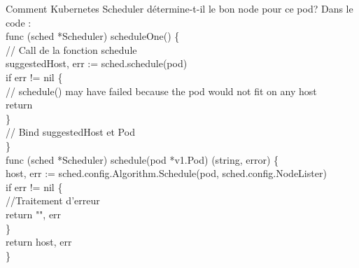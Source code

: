 \documentclass{bredelebeamer}
\begin{document}
\begin{frame}{Comment Kubernetes Scheduler détermine-t-il le bon node pour ce pod?}
Dans le code : \\
\textcolor{Framarouge}{func }\textcolor{Framaviolet}{(}\textcolor{Framaorange}{sched }\textcolor{Framaviolet}{*}\textcolor{Framaorange}{Scheduler}\textcolor{Framaviolet}{)} \textcolor{Framaviolet}{scheduleOne}() \{  \\
\hspace{10px}    \textcolor{Framavert}{// Call de la fonction schedule}\\


\hspace{10px}suggestedHost, err \textcolor{Framarouge}{:=} sched.\textcolor{Framableu}{schedule}(pod)	\\
\hspace{10px}\textcolor{Framarouge}{if} err != \textcolor{Framableu}{nil} \{	\\
\hspace{10px}\hspace{10px}	// schedule() may have failed because the pod would not fit on any host \\
	\hspace{10px}\hspace{10px}	\textcolor{Framarouge}{return}	\\
	\hspace{10px}\}	\\
\hspace{10px}    \textcolor{Framavert}{// Bind suggestedHost et Pod}\\
\}\\
\vspace{10px}
\textcolor{Framarouge}{func }\textcolor{Framaviolet}{(}\textcolor{Framaorange}{sched} \textcolor{Framaviolet}{*}\textcolor{Framaorange}{Scheduler}\textcolor{Framaviolet}{)}  \textcolor{Framaviolet}{schedule}(\textcolor{Framaorange}{pod} *\textcolor{Framaorange}{v1}.\textcolor{Framaorange}{Pod}) (\textcolor{Framaorange}{string}, \textcolor{Framaorange}{error}) \{	\\
\hspace{10px}host, err \textcolor{Framarouge}{:=} sched.config.Algorithm.\textcolor{Framableu}{Schedule}(pod, sched.config.NodeLister)	\\
\hspace{10px}\textcolor{Framarouge}{if} err != \textcolor{Framableu}{nil} \{	\\
\hspace{20px}		\textcolor{Framavert}{//Traitement d'erreur}	\\
\hspace{20px}		\textcolor{Framarouge}{return} "", err	\\
\hspace{10px}	\}	\\
\hspace{10px}	\textcolor{Framarouge}{return} host, err	\\
\}\\
\end{frame}
\end{document}
